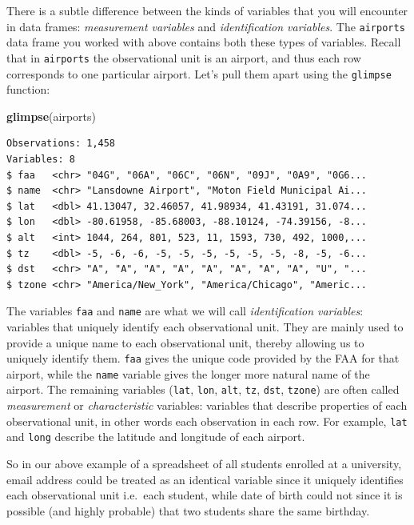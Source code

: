 \documentclass[12pt,]{krantz}
\makeatletter
\newenvironment{Shaded}{\begin{snugshade}}{\end{snugshade}}
\newcommand{\KeywordTok}[1]{\textcolor[rgb]{0.27,0.27,0.27}{\textbf{#1}}}
\newcommand{\NormalTok}[1]{#1}
\newenvironment{kframe}{%
\medskip{}
\setlength{\fboxsep}{.8em}
 \def\at@end@of@kframe{}%
 \ifinner\ifhmode%
  \def\at@end@of@kframe{\end{minipage}}%
  \begin{minipage}{\columnwidth}%
 \fi\fi%
 \def\FrameCommand##1{\hskip\@totalleftmargin \hskip-\fboxsep
 \colorbox{shadecolor}{##1}\hskip-\fboxsep
     \hskip-\linewidth \hskip-\@totalleftmargin \hskip\columnwidth}%
 \MakeFramed {\advance\hsize-\width
   \@totalleftmargin\z@ \linewidth\hsize
   \@setminipage}}%
 {\par\unskip\endMakeFramed%
 \at@end@of@kframe}
\renewenvironment{Shaded}{\begin{kframe}}{\end{kframe}}
\theoremstyle{definition}
\theoremstyle{definition}
\theoremstyle{definition}
\theoremstyle{remark}
\makeatother
\begin{document}
There is a subtle difference between the kinds of variables that you
will encounter in data frames: \emph{measurement variables} and
\emph{identification variables}. The \texttt{airports} data frame you
worked with above contains both these types of variables. Recall that in
\texttt{airports} the observational unit is an airport, and thus each
row corresponds to one particular airport. Let's pull them apart using
the \texttt{glimpse} function:

\begin{Shaded}
\begin{Highlighting}[]
\KeywordTok{glimpse}\NormalTok{(airports)}
\end{Highlighting}
\end{Shaded}

\begin{verbatim}
Observations: 1,458
Variables: 8
$ faa   <chr> "04G", "06A", "06C", "06N", "09J", "0A9", "0G6...
$ name  <chr> "Lansdowne Airport", "Moton Field Municipal Ai...
$ lat   <dbl> 41.13047, 32.46057, 41.98934, 41.43191, 31.074...
$ lon   <dbl> -80.61958, -85.68003, -88.10124, -74.39156, -8...
$ alt   <int> 1044, 264, 801, 523, 11, 1593, 730, 492, 1000,...
$ tz    <dbl> -5, -6, -6, -5, -5, -5, -5, -5, -5, -8, -5, -6...
$ dst   <chr> "A", "A", "A", "A", "A", "A", "A", "A", "U", "...
$ tzone <chr> "America/New_York", "America/Chicago", "Americ...
\end{verbatim}

The variables \texttt{faa} and \texttt{name} are what we will call
\emph{identification variables}: variables that uniquely identify each
observational unit. They are mainly used to provide a unique name to
each observational unit, thereby allowing us to uniquely identify them.
\texttt{faa} gives the unique code provided by the FAA for that airport,
while the \texttt{name} variable gives the longer more natural name of
the airport. The remaining variables (\texttt{lat}, \texttt{lon},
\texttt{alt}, \texttt{tz}, \texttt{dst}, \texttt{tzone}) are often
called \emph{measurement} or \emph{characteristic} variables: variables
that describe properties of each observational unit, in other words each
observation in each row. For example, \texttt{lat} and \texttt{long}
describe the latitude and longitude of each airport.

So in our above example of a spreadsheet of all students enrolled at a
university, email address could be treated as an identical variable
since it uniquely identifies each observational unit i.e.~each student,
while date of birth could not since it is possible (and highly probable)
that two students share the same birthday.
\end{document}
